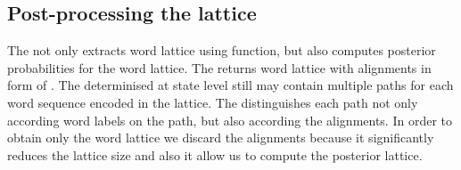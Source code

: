 % 

\subsection{Post-processing the lattice}
\label{sec:postprocess}
The  not only extracts word lattice using  function, but also computes posterior probabilities for the word lattice.
The  returns word lattice with alignments in form of .
The  determinised at state level still may contain multiple paths for each word sequence encoded in the lattice.
The  distinguishes each path not only according word labels on the path, but also according the alignments.
In order to obtain only the word lattice we discard the alignments because it significantly reduces the lattice size and also it allow us to compute the posterior lattice.

%


